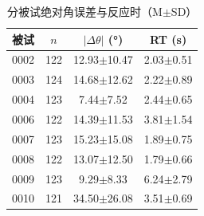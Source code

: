 \begin{table}[htbp]
  \centering
  \caption{分被试绝对角误差与反应时（M$\pm$SD）}
  \label{tab:desc-subject}
  \begin{tabular}{lccc}
    \toprule
    被试 & $n$ & $|\Delta\theta|$ (°) & RT (s) \\
    \midrule
    0002 & 122 & 12.93$\pm$10.47 & 2.03$\pm$0.51 \\
    0003 & 124 & 14.68$\pm$12.62 & 2.22$\pm$0.89 \\
    0004 & 123 & 7.44$\pm$7.52 & 2.44$\pm$0.65 \\
    0006 & 122 & 14.39$\pm$11.53 & 3.81$\pm$1.54 \\
    0007 & 123 & 15.23$\pm$15.08 & 1.89$\pm$0.75 \\
    0008 & 122 & 13.07$\pm$12.50 & 1.79$\pm$0.66 \\
    0009 & 123 & 9.29$\pm$8.33 & 6.24$\pm$2.79 \\
    0010 & 121 & 34.50$\pm$26.08 & 3.51$\pm$0.69 \\
    \bottomrule
  \end{tabular}
\end{table}
